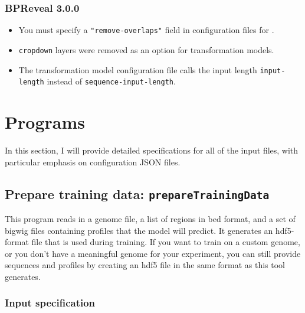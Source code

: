 \documentclass{article}
\begin{document}
\subsubsection{BPReveal 3.0.0}
\begin{itemize}
    \item You must specify a \texttt{"remove-overlaps"} field in configuration files for
        .
    \item \texttt{cropdown} layers were removed as an option for transformation models.
    \item The transformation model configuration file calls the input length
        \texttt{input-length} instead of \texttt{sequence-input-length}.
\end{itemize}


\section{Programs}

In this section, I will provide detailed specifications for all of the input files, with
particular emphasis on configuration JSON files.

\newpage
\subsection{Prepare training data: \texttt{prepareTrainingData}}\label{prog:prepareTrainingData}

This program reads in a genome file, a list of regions in bed format, and a set of bigwig
files containing profiles that the model will predict.
It generates an hdf5-format file that is used during training.
If you want to train on a custom genome, or you don't have a meaningful genome for your
experiment, you can still provide sequences and profiles by creating an hdf5 file
in the same format as this tool generates.

\subsubsection{Input specification}
\end{document}
